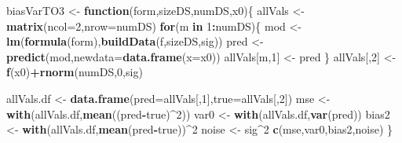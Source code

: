 \documentclass[]{article}
\newenvironment{Shaded}{\begin{snugshade}}{\end{snugshade}}
\newcommand{\ControlFlowTok}[1]{\textcolor[rgb]{0.13,0.29,0.53}{\textbf{#1}}}
\newcommand{\DataTypeTok}[1]{\textcolor[rgb]{0.13,0.29,0.53}{#1}}
\newcommand{\DecValTok}[1]{\textcolor[rgb]{0.00,0.00,0.81}{#1}}
\newcommand{\KeywordTok}[1]{\textcolor[rgb]{0.13,0.29,0.53}{\textbf{#1}}}
\newcommand{\NormalTok}[1]{#1}
\newcommand{\OperatorTok}[1]{\textcolor[rgb]{0.81,0.36,0.00}{\textbf{#1}}}
\newcommand{\StringTok}[1]{\textcolor[rgb]{0.31,0.60,0.02}{#1}}
\begin{document}
\begin{Shaded}
\begin{Highlighting}[]
\NormalTok{biasVarTO3 <-}\StringTok{ }\ControlFlowTok{function}\NormalTok{(form,sizeDS,numDS,x0)\{}
\NormalTok{  allVals <-}\StringTok{ }\KeywordTok{matrix}\NormalTok{(}\DataTypeTok{ncol=}\DecValTok{2}\NormalTok{,}\DataTypeTok{nrow=}\NormalTok{numDS)}
  \ControlFlowTok{for}\NormalTok{(m }\ControlFlowTok{in} \DecValTok{1}\OperatorTok{:}\NormalTok{numDS)\{}
\NormalTok{    mod <-}\StringTok{ }\KeywordTok{lm}\NormalTok{(}\KeywordTok{formula}\NormalTok{(form),}\KeywordTok{buildData}\NormalTok{(f,sizeDS,sig))}
\NormalTok{    pred <-}\StringTok{ }\KeywordTok{predict}\NormalTok{(mod,}\DataTypeTok{newdata=}\KeywordTok{data.frame}\NormalTok{(}\DataTypeTok{x=}\NormalTok{x0))}
\NormalTok{    allVals[m,}\DecValTok{1}\NormalTok{] <-}\StringTok{ }\NormalTok{pred}
\NormalTok{  \}}
\NormalTok{  allVals[,}\DecValTok{2}\NormalTok{] <-}\StringTok{ }\KeywordTok{f}\NormalTok{(x0)}\OperatorTok{+}\KeywordTok{rnorm}\NormalTok{(numDS,}\DecValTok{0}\NormalTok{,sig)}
  
\NormalTok{  allVals.df <-}\StringTok{ }\KeywordTok{data.frame}\NormalTok{(}\DataTypeTok{pred=}\NormalTok{allVals[,}\DecValTok{1}\NormalTok{],}\DataTypeTok{true=}\NormalTok{allVals[,}\DecValTok{2}\NormalTok{])}
\NormalTok{  mse <-}\StringTok{ }\KeywordTok{with}\NormalTok{(allVals.df,}\KeywordTok{mean}\NormalTok{((pred}\OperatorTok{-}\NormalTok{true)}\OperatorTok{^}\DecValTok{2}\NormalTok{))}
\NormalTok{  var0 <-}\StringTok{ }\KeywordTok{with}\NormalTok{(allVals.df,}\KeywordTok{var}\NormalTok{(pred))}
\NormalTok{  bias2 <-}\StringTok{ }\KeywordTok{with}\NormalTok{(allVals.df,}\KeywordTok{mean}\NormalTok{(pred}\OperatorTok{-}\NormalTok{true))}\OperatorTok{^}\DecValTok{2}
\NormalTok{  noise <-}\StringTok{ }\NormalTok{sig}\OperatorTok{^}\DecValTok{2}
  \KeywordTok{c}\NormalTok{(mse,var0,bias2,noise)}
\NormalTok{\}}


\end{Highlighting}
\end{Shaded}
\end{document}
